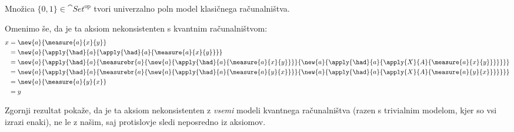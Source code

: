 \begin{proposition}
    Množica \(\{0,1\} ∈ \cat{Set}^{\textrm{op}}\) tvori univerzalno poln model klasičnega računalništva.
\end{proposition}

Omenimo še, da je ta aksiom nekonsistenten s kvantnim računalništvom:
\begin{align*}
    x &= \new{a}{\measure{a}{x}{y}}\\
      &= \new{a}{\apply{\had}{a}{\apply{\had}{a}{\measure{a}{x}{y}}}}\\
      &= \new{a}{\apply{\had}{a}{\measurebr{a}{
            \new{a}{\apply{\had}{a}{             \measure{a}{x}{y}}}}{
            \new{a}{\apply{\had}{a}{\apply{X}{A}{\measure{a}{x}{y}}}}
        }}}\\
      &= \new{a}{\apply{\had}{a}{\measurebr{a}{
            \new{a}{\apply{\had}{a}{             \measure{a}{y}{x}}}}{
            \new{a}{\apply{\had}{a}{\apply{X}{A}{\measure{a}{y}{x}}}}
        }}}\\
      &= \new{a}{\measure{a}{y}{x}}\\
      &= y
\end{align*}
\begin{remark}
    Zgornji rezultat pokaže, da je ta aksiom nekonsistenten z \emph{vsemi} modeli kvantnega računalništva (razen s trivialnim modelom, kjer so vsi izrazi enaki), ne le z našim, saj protislovje sledi neposredno iz aksiomov.
\end{remark}
